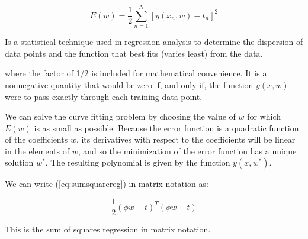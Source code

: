 \begin{Equation}[H]
	\centering
	\begin{equation} \label{eq:sumsquarereg}
		E(w)=\frac{1}{2} \sum_{n=1}^{N} [y(x_n,w)-t_n]^2
	\end{equation}
	\caption[Sum of squares regression.]{Is a statistical technique used in regression analysis to determine the dispersion of data points and the function that best fits (varies least) from the data.}
\end{Equation}

\noindent where the factor of 1/2 is included for mathematical convenience. It is a nonnegative quantity that would be zero if, and only if, the function $y(x, w)$ were to pass exactly through each training data point.

\noindent We can solve the curve fitting problem by choosing the value of $w$ for which $E(w)$ is as small as possible. Because the error function is a quadratic function of the coefficients $w$, its derivatives with respect to the coefficients will be linear in the elements of $w$, and so the minimization of the error function has a unique solution $w^*$. The resulting polynomial is given by the function $y(x, w^*)$.




\noindent We can write (\ref{eq:sumsquarereg}) in matrix notation as:

\begin{Equation}[H]
	\centering
	\begin{equation} \label{eq:sumsquareregvec}
	\frac{1}{2} (\phi w - t)^T (\phi w - t)
	\end{equation}
	\caption[Sum of squares regression in matrix notation.]{This is the sum of squares regression in matrix notation.}
\end{Equation}

